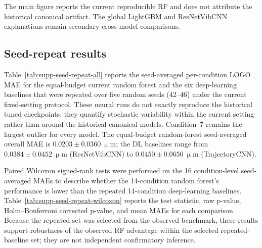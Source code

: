The main figure reports the current reproducible RF and does not attribute the
historical canonical artifact. The global LightGBM and ResNetVibCNN
explanations remain secondary cross-model comparisons.

\subsection*{Seed-repeat results}

Table~\ref{tab:supp-seed-repeat-all} reports the seed-averaged
per-condition LOGO MAE for the equal-budget current random forest and the six
deep-learning baselines that were repeated over five random seeds
(42--46) under the current fixed-setting protocol. These neural runs do not
exactly reproduce the historical tuned checkpoints; they quantify stochastic
variability within the current setting rather than around the historical
canonical models. Condition~7 remains the largest outlier for every model.
The equal-budget random-forest seed-averaged overall MAE is
\(0.0203 \pm 0.0360~\upmu\)m; the DL baselines range from
\(0.0384 \pm 0.0452~\upmu\)m (ResNetVibCNN) to
\(0.0450 \pm 0.0650~\upmu\)m (TrajectoryCNN).



Paired Wilcoxon signed-rank tests were performed on the 16 condition-level seed-averaged MAEs to describe whether the 14-condition random forest's performance is lower than the repeated 14-condition deep-learning baselines. Table~\ref{tab:supp-seed-repeat-wilcoxon} reports the test statistic, raw p-value, Holm--Bonferroni corrected p-value, and mean MAEs for each comparison. Because the repeated set was selected from the observed benchmark, these results support robustness of the observed RF advantage within the selected repeated-baseline set; they are not independent confirmatory inference.

\begin{table}[htbp]
\centering
\caption{Paired Wilcoxon signed-rank tests comparing the equal-budget
14-condition RF with the six repeated deep-learning baselines. Holm correction
is applied only across this selected six-comparison robustness family.}
\label{tab:supp-seed-repeat-wilcoxon}
\resizebox{\linewidth}{!}{}
\end{table}

